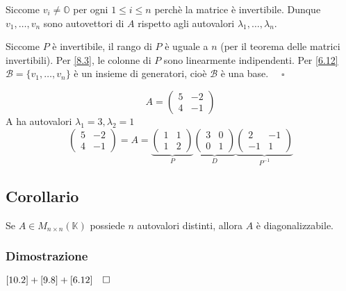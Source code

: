 \documentclass[a4paper]{article}
\theoremstyle{break}
\theoremstyle{break}
\theoremstyle{break}
\theoremstyle{break}
\begin{document}
\begin{itemize}
    \vspace{1em}
    \noindent Siccome \( v_i \neq \mathbb{O} \) per ogni \( 1 \le i \le n \) perchè la
    matrice è invertibile. Dunque \( v_1, \ldots, v_n \) sono autovettori di \( A \)
    rispetto agli autovalori \( \lambda_1, \ldots, \lambda_n \).

    \noindent Siccome \( P \) è invertibile, il rango di \( P \) è uguale a \( n \) (per
    il teorema delle matrici invertibili). Per \ref{8.3}, le colonne di \( P \) sono
    linearmente indipendenti. Per \ref{6.12} \( \mathcal{B} = \{v_1, \ldots, v_n\}  \) 
    è un insieme di generatori, cioè \( \mathcal{B} \) è una base. \( \quad \square \) 
\end{itemize}

\begin{example}
  \[
  A = \begin{pmatrix} 
    5 & -2\\
    4 & -1
  \end{pmatrix} 
  \] 
  A ha autovalori \( \lambda_1 = 3, \lambda_2 = 1 \)
  \[
  \begin{pmatrix} 
    5 & -2\\
    4 & -1
  \end{pmatrix} 
  =
  A
  =
  \underbrace{
  \begin{pmatrix} 
    1 & 1\\
    1 & 2
\end{pmatrix}}_{P}
  \underbrace{
  \begin{pmatrix} 
    3 & 0\\
    0 & 1
  \end{pmatrix}}_{D}
  \underbrace{
  \begin{pmatrix} 
    2 & -1\\
    -1 & 1
  \end{pmatrix}}_{P^{-1}}
  \] 
\end{example}

\subsection{Corollario}
\label{10.3}
Se \( A \in M_{n \times n}(\mathbb{K}) \) possiede \( n \) autovalori distinti, allora
\( A \) è diagonalizzabile.

\subsubsection{Dimostrazione}
\( \ref{10.2} + \ref{9.8} + \ref{6.12} \quad  \square \)
\end{document}
